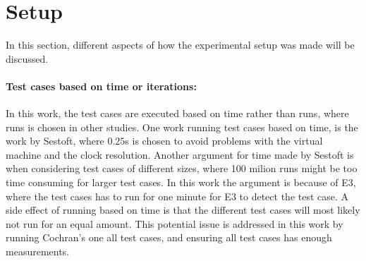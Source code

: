 \section*{Setup}

In this section, different aspects of how the experimental setup was made will be discussed.

\paragraph*{Test cases based on time or iterations:} In this work, the test cases are executed based on time rather than runs, where runs is chosen in other studies\cite*[]{Pereira2017,Koedijk2022diff,Georgiou2020}. One work running test cases based on time, is the work by Sestoft\cite*[]{sestoft2013microbenchmarks}, where $0.25$s is chosen to avoid problems with the virtual machine and the clock resolution. Another argument for time made by Sestoft\cite*[]{sestoft2013microbenchmarks} is when considering test cases of different sizes, where 100 milion runs might be too time consuming for larger test cases. In this work the argument is because of E3, where the test cases has to run for one minute for E3 to detect the test case. A side effect of running based on time is that the different test cases will most likely not run for an equal amount. This potential issue is addressed in this work by running Cochran's one all test cases, and ensuring all test cases has enough measurements. 



